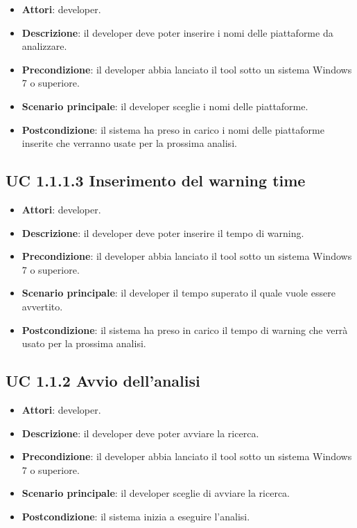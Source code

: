 		\begin{itemize}
			\item\textbf{Attori}: developer.
			\item\textbf{Descrizione}: il developer deve poter inserire i nomi delle piattaforme da analizzare.
			\item\textbf{Precondizione}: il developer abbia lanciato il tool sotto un sistema Windows 7 o superiore.
			\item\textbf{Scenario principale}: il developer sceglie i nomi delle piattaforme.
			\item\textbf{Postcondizione}: il sistema ha preso in carico i nomi delle piattaforme inserite che verranno usate per la prossima analisi.
		\end{itemize}
		
	\subsection{UC 1.1.1.3 Inserimento del warning time}
		\label{subsec:UC1.1.1.3}
		
		\begin{itemize}
			\item\textbf{Attori}: developer.
			\item\textbf{Descrizione}: il developer deve poter inserire il tempo di warning.
			\item\textbf{Precondizione}: il developer abbia lanciato il tool sotto un sistema Windows 7 o superiore.
			\item\textbf{Scenario principale}: il developer il tempo superato il quale vuole essere avvertito.
			\item\textbf{Postcondizione}: il sistema ha preso in carico il tempo di warning che verrà usato per la prossima analisi.
		\end{itemize}
		
	\subsection{UC 1.1.2 Avvio dell'analisi}
		\label{subsec:UC1.1.2}
		
		\begin{itemize}
			\item\textbf{Attori}: developer.
			\item\textbf{Descrizione}: il developer deve poter avviare la ricerca.
			\item\textbf{Precondizione}: il developer abbia lanciato il tool sotto un sistema Windows 7 o superiore.
			\item\textbf{Scenario principale}: il developer sceglie di avviare la ricerca.
			\item\textbf{Postcondizione}: il sistema inizia a eseguire l'analisi.
		\end{itemize}

